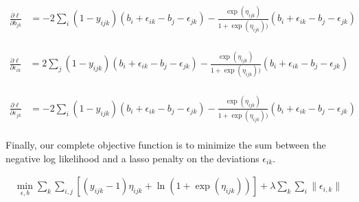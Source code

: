\documentclass[11pt, oneside]{article}   	%
\begin{document}
\begin{align*}
\frac{\partial \ell}{\partial b_{jk}} & = - 2 \sum_{i} (1-y_{ijk}) (b_i + \epsilon_{ik} - b_j - \epsilon_{jk}) - \frac{\exp(\eta_{ijk})}{1+\exp(\eta_{ijk}))}(b_i + \epsilon_{ik} - b_j - \epsilon_{jk}) \\
\end{align*}

\begin{align*}
\frac{\partial \ell}{\partial \epsilon_{ik}} & = 2 \sum_{j} (1-y_{ijk}) (b_i + \epsilon_{ik} - b_j - \epsilon_{jk}) - \frac{\exp(\eta_{ijk})}{1+\exp(\eta_{ijk}))}(b_i + \epsilon_{ik} - b_j - \epsilon_{jk}) \\
\end{align*}

\begin{align*}
\frac{\partial \ell}{\partial \epsilon_{jk}} & = - 2 \sum_{i} (1-y_{ijk}) (b_i + \epsilon_{ik} - b_j - \epsilon_{jk}) - \frac{\exp(\eta_{ijk})}{1+\exp(\eta_{ijk}))}(b_i + \epsilon_{ik} - b_j - \epsilon_{jk}) \\
\end{align*}

Finally, our complete objective function is to minimize the sum between the negative log likelihood and a lasso penalty on the deviations $\epsilon_{ik}$.

\begin{align*}
\min_{\epsilon, b} \sum_k \sum_{i,j} [ (y_{ijk} - 1)\eta_{ijk} +  \ln (1+\exp(\eta_{ijk})) ] + \lambda \sum_k \sum_i \| \epsilon_{i,k}\|
\end{align*}
\end{document}
